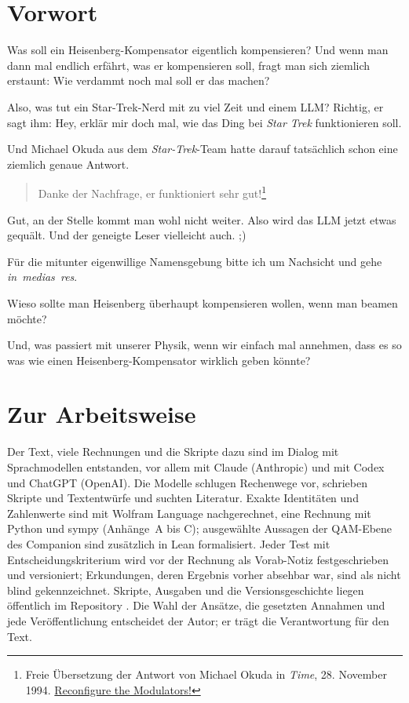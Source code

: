 \documentclass[11pt,a4paper]{article}
\begin{document}
\section*{Vorwort}
Was soll ein Heisenberg-Kompensator eigentlich kompensieren? Und wenn man dann mal endlich erfährt, was er kompensieren soll, fragt man sich ziemlich erstaunt: \glqq Wie verdammt noch mal soll er das machen?\grqq{}

Also, was tut ein Star-Trek-Nerd mit zu viel Zeit und einem LLM? Richtig, er sagt ihm: \glqq Hey, erklär mir doch mal, wie das Ding bei \emph{Star Trek} funktionieren soll.\grqq{}

Und Michael Okuda aus dem \emph{Star-Trek}-Team hatte darauf tatsächlich schon eine ziemlich genaue Antwort.

\begin{quote}
\glqq Danke der Nachfrage, er funktioniert sehr gut!\grqq{}\footnote{Freie Übersetzung der Antwort von Michael Okuda in \emph{Time}, 28. November 1994. \href{https://content.time.com/time/subscriber/article/0\%2C33009\%2C981892\%2C00.html}{Reconfigure the Modulators!}}
\end{quote}

Gut, an der Stelle kommt man wohl nicht weiter. Also wird das LLM jetzt etwas gequält. Und der geneigte Leser vielleicht auch. ;)

\noindent Für die mitunter eigenwillige Namensgebung bitte ich um Nachsicht und gehe \mbox{\emph{in medias res}}.

Wieso sollte man Heisenberg überhaupt kompensieren wollen, wenn man beamen möchte?

Und, was passiert mit unserer Physik, wenn wir einfach mal annehmen, dass es so was wie einen Heisenberg-Kompensator wirklich geben könnte?
\medskip









\section*{Zur Arbeitsweise}
Der Text, viele Rechnungen und die Skripte dazu sind im Dialog mit Sprachmodellen entstanden, vor allem mit Claude (Anthropic) und mit
Codex und ChatGPT (OpenAI). Die Modelle schlugen Rechenwege vor, schrieben Skripte und Textentwürfe und suchten Literatur. Exakte
Identitäten und Zahlenwerte sind mit Wolfram Language nachgerechnet, eine Rechnung mit Python und sympy (Anhänge~A bis C); ausgewählte Aussagen der QAM-Ebene des Companion
sind zusätzlich in Lean formalisiert. Jeder Test mit Entscheidungskriterium wird vor der Rechnung als Vorab-Notiz festgeschrieben und
versioniert; Erkundungen, deren Ergebnis vorher absehbar war, sind als nicht blind gekennzeichnet. Skripte, Ausgaben und die
Versionsgeschichte liegen öffentlich im Repository \cite{repo}. Die Wahl der Ansätze, die gesetzten Annahmen und jede Veröffentlichung
entscheidet der Autor; er trägt die Verantwortung für den Text.
\end{document}
